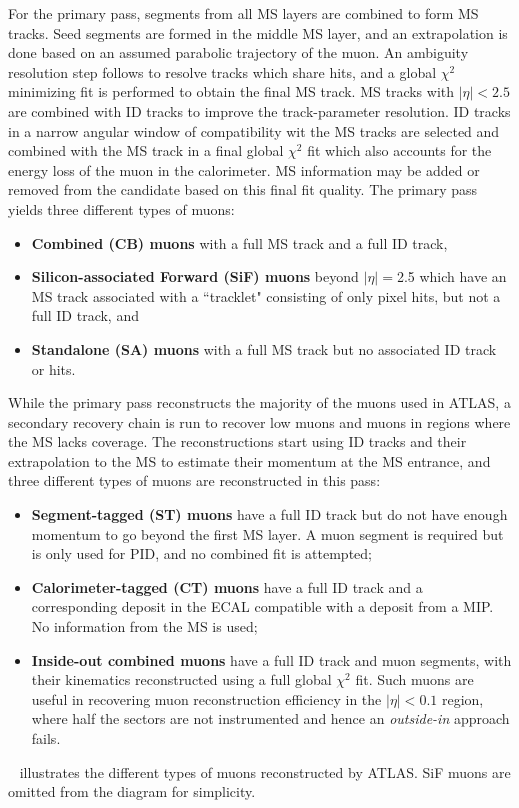 For the primary pass, segments from all MS layers are combined to form MS tracks. Seed segments are formed in the middle MS layer, and an extrapolation is done based on an assumed parabolic trajectory of the muon. An ambiguity resolution step follows to resolve tracks which share hits, and a global $\chi^2$ minimizing fit is performed to obtain the final MS track. MS tracks with $|\eta|<2.5$ are combined with ID tracks to improve the track-parameter resolution. ID tracks in a narrow angular window of compatibility wit the MS tracks are selected and combined with the MS track in a final global $\chi^2$ fit which also accounts for the energy loss of the muon in the calorimeter. MS information may be added or removed from the candidate based on this final fit quality. The primary pass yields three different types of muons:
\begin{itemize}
    \item \textbf{Combined (CB) muons} with a full MS track and a full ID track,
    \item \textbf{Silicon-associated Forward (SiF) muons} beyond $|\eta|=$2.5 which have an MS track associated with a ``tracklet" consisting of only pixel hits, but not a full ID track, and
    \item \textbf{Standalone (SA) muons} with a full MS track but no associated ID track or hits.
\end{itemize}

While the primary pass reconstructs the majority of the muons used in ATLAS, a secondary recovery chain is run to recover low \pT muons and muons in regions where the MS lacks coverage. The reconstructions start using ID tracks and their extrapolation to the MS to estimate their momentum at the MS entrance, and three different types of muons are reconstructed in this pass:
\begin{itemize}
    \item \textbf{Segment-tagged (ST) muons} have a full ID track but do not have enough momentum to go beyond the first MS layer. A muon segment is required but is only used for PID, and no combined fit is attempted;
    \item \textbf{Calorimeter-tagged (CT) muons} have a full ID track and a corresponding deposit in the ECAL compatible with a deposit from a MIP. No information from the MS is used;
    \item \textbf{Inside-out combined muons} have a full ID track and muon segments, with their kinematics reconstructed using a full global $\chi^2$ fit. Such muons are useful in recovering muon reconstruction efficiency in the $|\eta|<0.1$ region, where half the sectors are not instrumented and hence an \textit{outside-in} approach fails.
\end{itemize}
~ illustrates the different types of muons reconstructed by ATLAS. SiF muons are omitted from the diagram for simplicity.

